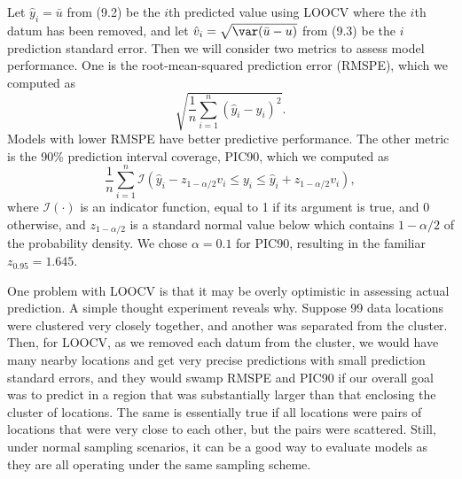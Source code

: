 \documentclass[12pt, titlepage]{article}
\begin{document}
Let $\hat{y}_{i} = \bar{u}$ from (9.2) be the $i$th predicted value using LOOCV where the $i$th datum has been removed, and let $\hat{v}_{i} = \sqrt{\var(\bar{u} - u)}$ from (9.3) be the $i$ prediction standard error.  Then we will consider two metrics to assess model performance.  One is the root-mean-squared prediction error (RMSPE), which we computed as
$$
\sqrt{\frac{1}{n}\sum_{i=1}^{n} (\hat{y}_{i} - y_{i})^{2} }.
$$
Models with lower RMSPE have better predictive performance.  The other metric is the 90\% prediction interval coverage, PIC90, which we computed as
$$
\frac{1}{n} \sum_{i=1}^{n} \mathcal{I}(\hat{y}_{i} - z_{1-\alpha/2}v_{i} \le y_{i} \le \hat{y}_{i} + z_{1-\alpha/2}v_{i}),
$$
where $\mathcal{I}(\cdot)$ is an indicator function, equal to 1 if its argument is true, and 0 otherwise, and $z_{1-\alpha/2}$ is a standard normal value below which contains $1-\alpha/2$ of the probability density.  We chose $\alpha = 0.1$ for PIC90, resulting in the familiar $z_{0.95} = 1.645$.

One problem with LOOCV is that it may be overly optimistic in assessing actual prediction.  A simple thought experiment reveals why.  Suppose 99 data locations were clustered very closely together, and another was separated from the cluster.  Then, for LOOCV, as we removed each datum from the cluster, we would have many nearby locations and get very precise predictions with small prediction standard errors, and they would swamp RMSPE and PIC90 if our overall goal was to predict in a region that was substantially larger than that enclosing the cluster of locations. The same is essentially true if all locations were pairs of locations that were very close to each other, but the pairs were scattered.  Still, under normal sampling scenarios, it can be a good way to evaluate models as they are all operating under the same sampling scheme.
\end{document}
